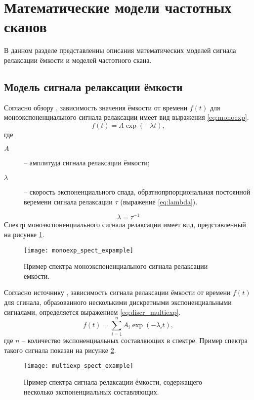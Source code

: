 \section{Математические модели частотных сканов}
    В данном разделе представленны описания математических моделей сигнала
    релаксации ёмкости и моделей частотного скана.


    \subsection{Модель сигнала релаксации ёмкости}
    Согласно обзору \cite{istratov_exp_analysis}, зависимость значения
    ёмкости от времени $f(t)$ для моноэкспоненциального сигнала релаксации
    имеет вид выражения \ref{eq:monoexp}.
    \begin{equation}
        \label{eq:monoexp}
        f(t) = A \exp \left(-\lambda t\right) ,
    \end{equation}
    где
    \begin{description}
        \item[\(A\)] -- амплитуда сигнала релаксации ёмкости;
        \item[\(\lambda\)] -- скорость экспоненциального спада,
        обратнопрпорциональная постоянной веремени сигнала релаксации
        $\tau$ (выражение \ref{eq:lambda}).
    \end{description}
    \begin{equation}
        \label{eq:lambda}
        \lambda = \tau ^ {-1}
    \end{equation}
    Спектр моноэкспоненциального сигнала релаксации имеет вид, 
    представленный на рисунке \ref{pic:monoexp_spect_example}.
    \begin{figure}[!ht]
        \centering
        \texttt{[image: monoexp\_spect\_expample]}
        \caption{Пример спектра моноэкспоненциального сигнала релаксации
        ёмкости.}
        \label{pic:monoexp_spect_example}
    \end{figure}

    Согласно источнику \cite{istratov_exp_analysis}, зависимость сигнала 
    релаксации ёмкости от времени $f(t)$ для сгинала, образованного 
    несколькими дискретными экспоненциальными сигналами, определяется 
    выражением 
    \ref{eq:discr_multiexp}.
    \begin{equation}
        \label{eq:discr_multiexp}
        f(t) = \sum_{i=1}^{n}A_i\exp\left(-\lambda_i t\right) ,
    \end{equation}
    где $n$ -- количество экспоненциальных составляющих в спектре.
    Пример спектра такого сигнала показан на рисунке 
    \ref{pic:multiexp_spect_example}.
    \begin{figure}[!ht]
        \centering
        \texttt{[image: multiexp\_spect\_example]}
        \caption{Пример спектра сигнала релаксации ёмкости, содержащего
        несколько экспоненциальных составляющих.}
        \label{pic:multiexp_spect_example}
    \end{figure}


